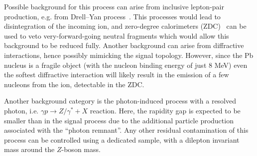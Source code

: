 Possible background for this process can arise from inclusive lepton-pair production, e.g. from Drell--Yan process~\cite{Drell:1970wh,Aad:2015gta,Khachatryan:2015pzs,Alice:2016wka}.
This processes would lead to disintegration of the incoming ion, and zero-degree calorimeters (ZDC)~\cite{Dellacasa:1999ke,ATLAS:2007aa} can be used to veto very-forward-going neutral fragments which would allow this background 
to be reduced fully.
Another background can arise from diffractive interactions, hence possibly mimicking the signal topology.
However, since the Pb nucleus is a fragile object (with the nucleon binding energy of just 8 MeV) even the softest diffractive interaction will likely result in the emission of a few nucleons from the ion, detectable in the ZDC.

Another background category is the photon-induced process with a resolved photon, i.e. 
$\gamma p\rightarrow Z/\gamma^*+X$ reaction.
Here, the rapidity gap is expected to be smaller than in the signal process due to the additional particle production associated with the ``photon remnant''.
Any other residual contamination of this process can be controlled using a dedicated sample, with a dilepton invariant mass around the $Z$-boson mass.



